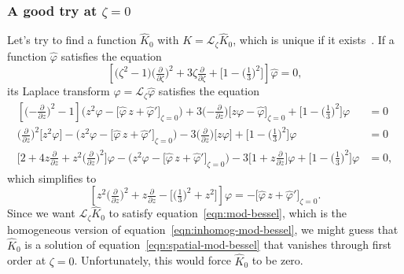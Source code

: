 \documentclass{article}
\newcommand{\laplace}{\mathcal{L}}
\begin{document}
\subsubsection{A good try at $\zeta = 0$}
Let's try to find a function $\hat{K}_0$ with $K = \laplace_\zeta \hat{K}_0$, which is unique if it exists~\cite[Theorem~1.23]{laplace-tfm}. If a function $\hat{\varphi}$ satisfies the equation
\begin{equation}\label{eqn:spatial-mod-bessel}
\left[\big(\zeta^2 - 1\big) \big(\tfrac{\partial}{\partial \zeta}\big)^2 + 3\zeta \tfrac{\partial}{\partial \zeta} + \big[1 - \big(\tfrac{1}{3}\big)^2\big]\right] \hat{\varphi} = 0,
\end{equation}
its Laplace transform $\varphi = \laplace_\zeta \hat{\varphi}$ satisfies the equation
\begin{align*}
\left[\big({-\tfrac{\partial}{\partial z}}\big)^2 - 1\right] \Big(z^2 \varphi - \big[\hat{\varphi}\,z + \hat{\varphi}'\big]_{\zeta = 0}\Big) + 3\big({-\tfrac{\partial}{\partial z}}\big)\big[z\varphi - \hat{\varphi}\big]_{\zeta = 0} + \big[1 - \big(\tfrac{1}{3}\big)^2\big] \varphi & = 0 \\
\big(\tfrac{\partial}{\partial z}\big)^2 \big[z^2 \varphi\big] - \Big(z^2 \varphi - \big[\hat{\varphi}\,z + \hat{\varphi}'\big]_{\zeta = 0}\Big) - 3\big(\tfrac{\partial}{\partial z}\big)\big[z\varphi\big] + \big[1 - \big(\tfrac{1}{3}\big)^2\big] \varphi & = 0 \\
\Big[2 + 4z\tfrac{\partial}{\partial z} + z^2\big(\tfrac{\partial}{\partial z}\big)^2\Big]\varphi - \Big(z^2 \varphi - \big[\hat{\varphi}\,z + \hat{\varphi}'\big]_{\zeta = 0}\Big) - 3\Big[1 + z\tfrac{\partial}{\partial z}\Big]\varphi + \big[1 - \big(\tfrac{1}{3}\big)^2\big] \varphi & = 0,
\end{align*}
which simplifies to
\begin{equation}\label{eqn:inhomog-mod-bessel}
\left[z^2 \big(\tfrac{\partial}{\partial z}\big)^2 + z \tfrac{\partial}{\partial z} - \big[\big(\tfrac{1}{3}\big)^2 + z^2\big]\right] \varphi = -\big[\hat{\varphi}\,z + \hat{\varphi}'\big]_{\zeta = 0}.
\end{equation}
Since we want $\laplace_\zeta \hat{K}_0$ to satisfy equation~\ref{eqn:mod-bessel}, which is the homogeneous version of equation~\ref{eqn:inhomog-mod-bessel}, we might guess that $\hat{K}_0$ is a solution of equation~\ref{eqn:spatial-mod-bessel} that vanishes through first order at $\zeta = 0$. Unfortunately, this would force $\hat{K}_0$ to be zero.
\end{document}
